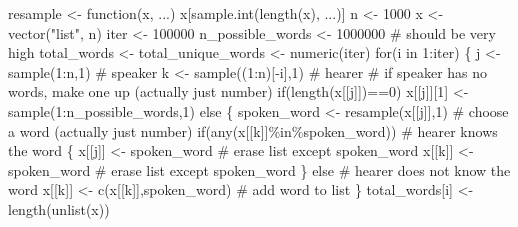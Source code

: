 \documentclass[
  a4paper,
  DIV=11,
  numbers=noendperiod,
  oneside]{scrreprt}
\newenvironment{Shaded}{}{}
\newcommand{\CommentTok}[1]{\textcolor[rgb]{0.42,0.45,0.49}{#1}}
\newcommand{\ControlFlowTok}[1]{\textcolor[rgb]{0.84,0.23,0.29}{#1}}
\newcommand{\DecValTok}[1]{\textcolor[rgb]{0.00,0.36,0.77}{#1}}
\newcommand{\FunctionTok}[1]{\textcolor[rgb]{0.44,0.26,0.76}{#1}}
\newcommand{\NormalTok}[1]{\textcolor[rgb]{0.14,0.16,0.18}{#1}}
\newcommand{\OtherTok}[1]{\textcolor[rgb]{0.44,0.26,0.76}{#1}}
\newcommand{\SpecialCharTok}[1]{\textcolor[rgb]{0.00,0.36,0.77}{#1}}
\newcommand{\StringTok}[1]{\textcolor[rgb]{0.01,0.18,0.38}{#1}}
\begin{document}
\begin{Shaded}
\begin{Highlighting}[]
\NormalTok{resample }\OtherTok{\textless{}{-}} \ControlFlowTok{function}\NormalTok{(x, ...) x[}\FunctionTok{sample.int}\NormalTok{(}\FunctionTok{length}\NormalTok{(x), ...)]}
\NormalTok{n }\OtherTok{\textless{}{-}} \DecValTok{1000}
\NormalTok{x }\OtherTok{\textless{}{-}} \FunctionTok{vector}\NormalTok{(}\StringTok{"list"}\NormalTok{, n)}
\NormalTok{iter }\OtherTok{\textless{}{-}} \DecValTok{100000}
\NormalTok{n\_possible\_words }\OtherTok{\textless{}{-}} \DecValTok{1000000} \CommentTok{\# should be very high}
\NormalTok{total\_words }\OtherTok{\textless{}{-}}\NormalTok{ total\_unique\_words  }\OtherTok{\textless{}{-}}  \FunctionTok{numeric}\NormalTok{(iter)}
\ControlFlowTok{for}\NormalTok{(i }\ControlFlowTok{in} \DecValTok{1}\SpecialCharTok{:}\NormalTok{iter)}
\NormalTok{\{}
\NormalTok{  j }\OtherTok{\textless{}{-}} \FunctionTok{sample}\NormalTok{(}\DecValTok{1}\SpecialCharTok{:}\NormalTok{n,}\DecValTok{1}\NormalTok{) }\CommentTok{\# speaker}
\NormalTok{  k }\OtherTok{\textless{}{-}} \FunctionTok{sample}\NormalTok{((}\DecValTok{1}\SpecialCharTok{:}\NormalTok{n)[}\SpecialCharTok{{-}}\NormalTok{i],}\DecValTok{1}\NormalTok{) }\CommentTok{\# hearer}
  \CommentTok{\# if speaker has no words, make one up (actually just number)}
  \ControlFlowTok{if}\NormalTok{(}\FunctionTok{length}\NormalTok{(x[[j]])}\SpecialCharTok{==}\DecValTok{0}\NormalTok{) x[[j]][}\DecValTok{1}\NormalTok{] }\OtherTok{\textless{}{-}} \FunctionTok{sample}\NormalTok{(}\DecValTok{1}\SpecialCharTok{:}\NormalTok{n\_possible\_words,}\DecValTok{1}\NormalTok{) }\ControlFlowTok{else} 
\NormalTok{  \{}
\NormalTok{    spoken\_word }\OtherTok{\textless{}{-}} \FunctionTok{resample}\NormalTok{(x[[j]],}\DecValTok{1}\NormalTok{) }\CommentTok{\# choose a word (actually just number)}
    \ControlFlowTok{if}\NormalTok{(}\FunctionTok{any}\NormalTok{(x[[k]]}\SpecialCharTok{\%in\%}\NormalTok{spoken\_word)) }\CommentTok{\# hearer knows the word}
\NormalTok{    \{}
\NormalTok{      x[[j]] }\OtherTok{\textless{}{-}}\NormalTok{ spoken\_word }\CommentTok{\# erase list except spoken\_word}
\NormalTok{      x[[k]] }\OtherTok{\textless{}{-}}\NormalTok{ spoken\_word }\CommentTok{\# erase list except spoken\_word}
\NormalTok{    \} }\ControlFlowTok{else} \CommentTok{\# hearer does not know the word}
\NormalTok{      x[[k]] }\OtherTok{\textless{}{-}} \FunctionTok{c}\NormalTok{(x[[k]],spoken\_word)  }\CommentTok{\# add word to list}
\NormalTok{  \} }
\NormalTok{  total\_words[i] }\OtherTok{\textless{}{-}} \FunctionTok{length}\NormalTok{(}\FunctionTok{unlist}\NormalTok{(x))}

\end{Highlighting}
\end{Shaded}
\end{document}

